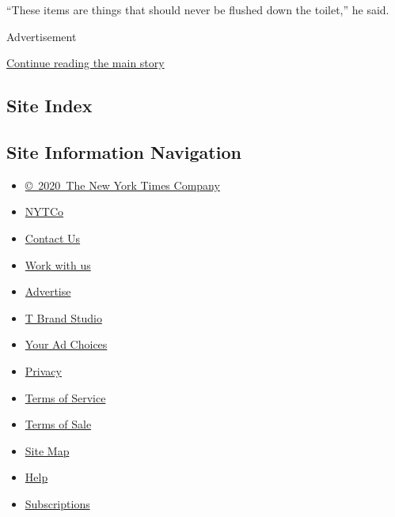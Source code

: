 ``These items are things that should never be flushed down the toilet,''
he said.

Advertisement

\protect\hyperlink{after-bottom}{Continue reading the main story}

\hypertarget{site-index}{%
\subsection{Site Index}\label{site-index}}

\hypertarget{site-information-navigation}{%
\subsection{Site Information
Navigation}\label{site-information-navigation}}

\begin{itemize}
\tightlist
\item
  \href{https://help.nytimes3xbfgragh.onion/hc/en-us/articles/115014792127-Copyright-notice}{©~2020~The
  New York Times Company}
\end{itemize}

\begin{itemize}
\tightlist
\item
  \href{https://www.nytco.com/}{NYTCo}
\item
  \href{https://help.nytimes3xbfgragh.onion/hc/en-us/articles/115015385887-Contact-Us}{Contact
  Us}
\item
  \href{https://www.nytco.com/careers/}{Work with us}
\item
  \href{https://nytmediakit.com/}{Advertise}
\item
  \href{http://www.tbrandstudio.com/}{T Brand Studio}
\item
  \href{https://www.nytimes3xbfgragh.onion/privacy/cookie-policy\#how-do-i-manage-trackers}{Your
  Ad Choices}
\item
  \href{https://www.nytimes3xbfgragh.onion/privacy}{Privacy}
\item
  \href{https://help.nytimes3xbfgragh.onion/hc/en-us/articles/115014893428-Terms-of-service}{Terms
  of Service}
\item
  \href{https://help.nytimes3xbfgragh.onion/hc/en-us/articles/115014893968-Terms-of-sale}{Terms
  of Sale}
\item
  \href{https://spiderbites.nytimes3xbfgragh.onion}{Site Map}
\item
  \href{https://help.nytimes3xbfgragh.onion/hc/en-us}{Help}
\item
  \href{https://www.nytimes3xbfgragh.onion/subscription?campaignId=37WXW}{Subscriptions}
\end{itemize}

